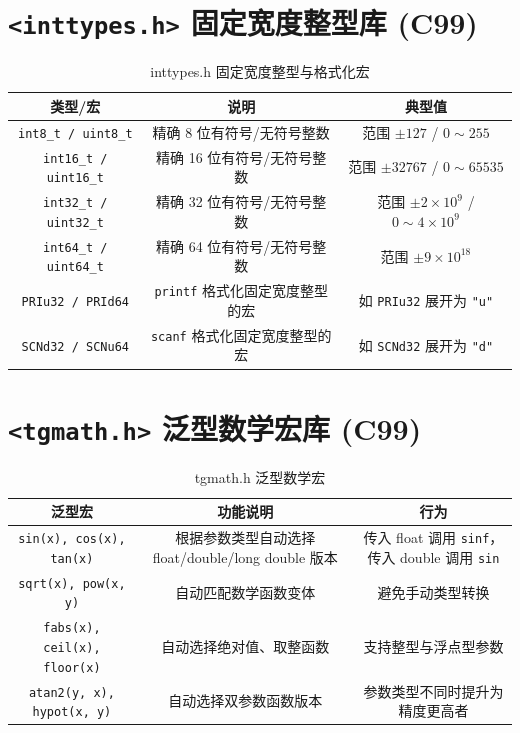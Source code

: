 \section{\texorpdfstring{\texttt{<inttypes.h>} 固定宽度整型库 (C99)}{<inttypes.h> 固定宽度整型库 (C99)}}

\begin{table}[H]
\centering
\small
\renewcommand{\arraystretch}{1.5}
\begin{tabulary}{\linewidth}{CCC}
\toprule
\textbf{类型/宏} & \textbf{说明} & \textbf{典型值} \\ \midrule
\texttt{int8\_t / uint8\_t} & 精确 8 位有符号/无符号整数 & 范围 $\pm 127$ / $0 \sim 255$ \\ 
\texttt{int16\_t / uint16\_t} & 精确 16 位有符号/无符号整数 & 范围 $\pm 32767$ / $0 \sim 65535$ \\ 
\texttt{int32\_t / uint32\_t} & 精确 32 位有符号/无符号整数 & 范围 $\pm 2\times 10^9$ / $0 \sim 4\times 10^9$ \\ 
\texttt{int64\_t / uint64\_t} & 精确 64 位有符号/无符号整数 & 范围 $\pm 9\times 10^{18}$ \\ 
\texttt{PRIu32 / PRId64} & \texttt{printf} 格式化固定宽度整型的宏 & 如 \texttt{PRIu32} 展开为 \texttt{"u"} \\ 
\texttt{SCNd32 / SCNu64} & \texttt{scanf} 格式化固定宽度整型的宏 & 如 \texttt{SCNd32} 展开为 \texttt{"d"} \\ \bottomrule
\end{tabulary}
\caption{inttypes.h 固定宽度整型与格式化宏}
\label{tab:inttypes}
\end{table}

\section{\texorpdfstring{\texttt{<tgmath.h>} 泛型数学宏库 (C99)}{<tgmath.h> 泛型数学宏库 (C99)}}

\begin{table}[H]
\centering
\small
\renewcommand{\arraystretch}{1.5}
\begin{tabulary}{\linewidth}{CCC}
\toprule
\textbf{泛型宏} & \textbf{功能说明} & \textbf{行为} \\ \midrule
\texttt{sin(x), cos(x), tan(x)} & 根据参数类型自动选择 float/double/long double 版本 & 传入 float 调用 \texttt{sinf}，传入 double 调用 \texttt{sin} \\ 
\texttt{sqrt(x), pow(x, y)} & 自动匹配数学函数变体 & 避免手动类型转换 \\ 
\texttt{fabs(x), ceil(x), floor(x)} & 自动选择绝对值、取整函数 & 支持整型与浮点型参数 \\ 
\texttt{atan2(y, x), hypot(x, y)} & 自动选择双参数函数版本 & 参数类型不同时提升为精度更高者 \\ \bottomrule
\end{tabulary}
\caption{tgmath.h 泛型数学宏}
\label{tab:tgmath}
\end{table}

